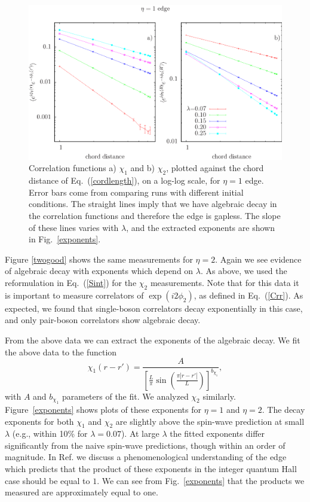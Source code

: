 \begin{figure}
\includegraphics[width=0.6\linewidth]{figures/onecord.eps}
\caption{ Correlation functions a) $\chi_1$ and b) $\chi_2$, plotted against the chord distance of Eq.~(\ref{cordlength}), on a log-log scale, for $\eta=1$ edge.  Error bars come from comparing runs with different initial conditions.  The straight lines imply that we have algebraic decay in the correlation functions and therefore the edge is gapless.  The slope of these lines varies with $\lambda$, and the extracted exponents are shown in Fig.~\ref{exponents}.}
\label{onegood}
\end{figure}

Figure \ref{twogood} shows the same measurements for $\eta=2$. Again we see evidence of algebraic decay with exponents which depend on $\lambda$. As above, we used the reformulation in Eq.~(\ref{Sint}) for the $\chi_2$ measurements. Note that for this data it is important to measure correlators of $\exp(i2\phi_2)$, as defined in Eq.~(\ref{Crr}). As expected, we found that single-boson correlators decay exponentially in this case, and only pair-boson correlators show algebraic decay.


From the above data we can extract the exponents of the algebraic decay. We fit the above data to the function
\begin{equation}
\chi_1(r-r')=\frac{A}{\left[\frac{L}{\pi}\sin\left(\frac{\pi|r-r'|}{L}\right)\right]^{b_{\chi_1}}},
\label{fitfunction}
\end{equation}
with $A$ and $b_{\chi_1}$ parameters of the fit. We analyzed $\chi_2$ similarly.  Figure~\ref{exponents} shows plots of these exponents for $\eta=1$ and $\eta=2$. The decay exponents for both $\chi_1$ and $\chi_2$ are slightly above the spin-wave prediction at small $\lambda$ (e.g., within 10\% for $\lambda =0.07$). At large $\lambda$ the fitted exponents differ significantly from the naive spin-wave predictions, though within an order of magnitude. 
In Ref.\cite{FQHE}
 we discuss a phenomenological understanding of the edge which predicts that the product of these exponents in the integer quantum Hall case should be equal to $1$.
We can see from Fig.~\ref{exponents} that the products we measured are approximately equal to one.

